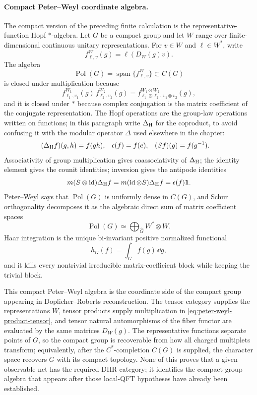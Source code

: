 \paragraph{Compact Peter--Weyl coordinate algebra.}
\label{par:compact-peter-weyl-coordinate-algebra}
The compact version of the preceding finite calculation is the
representative-function Hopf \(*\)-algebra.  Let \(G\) be a compact group and
let \(W\) range over finite-dimensional continuous unitary representations.
For \(v\in W\) and \(\ell\in W^*\), write
\[
  f_{\ell,v}^W(g)=\ell(D_W(g)v).
\]
The algebra
\[
  \operatorname{Pol}(G)
  =
  \operatorname{span}\{f_{\ell,v}^W\}
  \subset C(G)
\]
is closed under multiplication because
\begin{equation}
  f_{\ell_1,v_1}^{W_1}(g)\,f_{\ell_2,v_2}^{W_2}(g)
  =
  f_{\ell_1\otimes\ell_2,\,v_1\otimes v_2}^{W_1\otimes W_2}(g),
  \label{eq:peter-weyl-product-tensor}
\end{equation}
and it is closed under \(*\) because complex conjugation is the matrix
coefficient of the conjugate representation.  The Hopf operations are the
group-law operations written on functions; in this paragraph write
\(\Delta_{\rm H}\) for the coproduct, to avoid confusing it with the modular
operator \(\Delta\) used elsewhere in the chapter:
\begin{equation}
\begin{aligned}
  (\Delta_{\rm H} f)(g,h)&=f(gh),
&
  \epsilon(f)&=f(e),
&
  (Sf)(g)&=f(g^{-1}).
\end{aligned}
  \label{eq:peter-weyl-hopf-operations}
\end{equation}
Associativity of group multiplication gives coassociativity of
\(\Delta_{\rm H}\); the identity element gives the counit identities;
inversion gives the antipode identities
\[
  m(S\otimes\operatorname{id})\Delta_{\rm H} f
  =
  m(\operatorname{id}\otimes S)\Delta_{\rm H} f
  =
  \epsilon(f)\mathbf1 .
\]
Peter--Weyl says that \(\operatorname{Pol}(G)\) is uniformly dense in \(C(G)\),
and Schur orthogonality decomposes it as the algebraic direct sum of matrix
coefficient spaces
\[
  \operatorname{Pol}(G)
  \simeq
  \bigoplus_{\widehat G} W^*\otimes W .
\]
Haar integration is the unique bi-invariant positive normalized functional
\[
  h_G(f)=\int_G f(g)\,\dd g ,
\]
and it kills every nontrivial irreducible matrix-coefficient block while
keeping the trivial block.

This compact Peter--Weyl algebra is the coordinate side of the compact group
appearing in Doplicher--Roberts reconstruction.  The tensor category supplies
the representations \(W\), tensor products supply multiplication in
\eqref{eq:peter-weyl-product-tensor}, and tensor natural automorphisms of the
fiber functor are evaluated by the same matrices \(D_W(g)\).  The
representative functions separate points of \(G\), so the compact group is
recoverable from how all charged multiplets transform; equivalently, after
the \(C^*\)-completion \(C(G)\) is supplied, the character space recovers
\(G\) with its compact topology.  None of this proves that a given observable
net has the required DHR category; it identifies the compact-group algebra
that appears after those local-QFT hypotheses have already been established.

